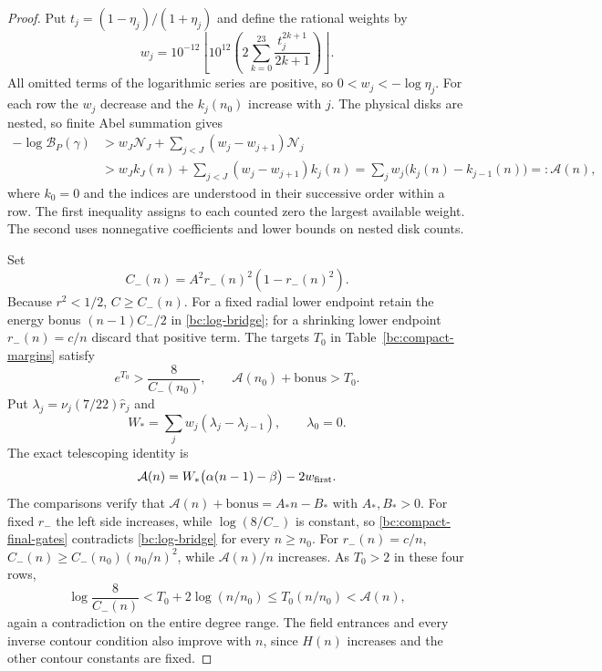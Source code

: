\begin{proof}
Put $t_j=(1-\eta_j)/(1+\eta_j)$ and define the rational weights by
\begin{equation}\label{bc:weights}
 w_j=10^{-12}\left\lfloor10^{12}
       \left(2\sum_{k=0}^{23}\frac{t_j^{2k+1}}{2k+1}\right)
       \right\rfloor.
\end{equation}
All omitted terms of the logarithmic series are positive, so
$0<w_j<-\log\eta_j$.
For each row the $w_j$ decrease and the $k_j(n_0)$ increase with $j$.
The physical disks are nested, so finite Abel summation gives
\begin{align}
 -\log\mathcal B_P(\gamma)
 &>w_J\mathcal N_J+
         \sum_{j<J}(w_j-w_{j+1})\mathcal N_j\nonumber\\
 &>w_Jk_J(n)+
         \sum_{j<J}(w_j-w_{j+1})k_j(n)
   =\sum_jw_j\bigl(k_j(n)-k_{j-1}(n)\bigr)
   =:\mathcal A(n),                               \label{bc:Abel}
\end{align}
where $k_0=0$ and the indices are understood in their successive
order within a row.  The first inequality assigns to each counted
zero the largest available weight.  The second uses nonnegative
coefficients and lower bounds on nested disk counts.

Set
\[
 C_-(n)=A^2r_-(n)^2(1-r_-(n)^2).
\]
Because $r^2<1/2$, $C\geq C_-(n)$.
For a fixed radial lower endpoint retain the energy bonus
$(n-1)C_-/2$ in \eqref{bc:log-bridge}; for a shrinking lower
endpoint $r_-(n)=c/n$ discard that positive term.
The targets $T_0$ in Table~\ref{bc:compact-margins} satisfy
\begin{equation}\label{bc:compact-final-gates}
 e^{T_0}>\frac8{C_-(n_0)},\qquad
 \mathcal A(n_0)+\text{bonus}>T_0.
\end{equation}
Put $\lambda_j=\nu_j(7/22)\widehat r_j$ and
\[
 W_*=\sum_jw_j(\lambda_j-\lambda_{j-1}),\qquad\lambda_0=0.
\]
The exact telescoping identity is
\[
 \mathcal A(n)=W_*\bigl(\alpha(n-1)-\beta\bigr)-2w_{\rm first}.
\]
The comparisons verify that $\mathcal A(n)+\text{bonus}=A_*n-B_*$
with $A_*,B_*>0$.
For fixed $r_-$ the left side increases, while $\log(8/C_-)$ is
constant, so \eqref{bc:compact-final-gates} contradicts
\eqref{bc:log-bridge} for every $n\geq n_0$.
For $r_-(n)=c/n$,
$C_-(n)\geq C_-(n_0)(n_0/n)^2$, while $\mathcal A(n)/n$
increases.  As $T_0>2$ in these four rows,
\[
 \log\frac8{C_-(n)}
 <T_0+2\log(n/n_0)
 \leq T_0(n/n_0)<\mathcal A(n),
\]
again a contradiction on the entire degree range.
The field entrances and every inverse contour condition also improve
with $n$, since $H(n)$ increases and the other contour constants are
fixed.


\end{proof}
